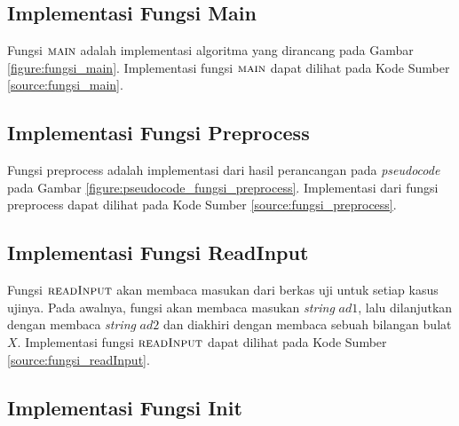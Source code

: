 \begin{minipage}{\linewidth}

\end{minipage}
	
\subsection{Implementasi Fungsi Main}
Fungsi $ \textnormal{\scshape main} $ adalah implementasi algoritma yang dirancang pada Gambar \ref{figure:fungsi_main}. Implementasi fungsi $ \textnormal{\scshape main} $ dapat dilihat pada Kode Sumber \ref{source:fungsi_main}.



\subsection{Implementasi Fungsi Preprocess}
Fungsi preprocess adalah implementasi dari hasil perancangan pada \textit{pseudocode} pada Gambar \ref{figure:pseudocode_fungsi_preprocess}. Implementasi dari fungsi preprocess dapat dilihat pada Kode Sumber \ref{source:fungsi_preprocess}.



\subsection{Implementasi Fungsi ReadInput}

Fungsi $ \textnormal{\scshape readInput} $ akan membaca masukan dari berkas uji untuk setiap kasus ujinya. Pada awalnya, fungsi akan membaca masukan \textit{string} $ad1$, lalu dilanjutkan dengan membaca \textit{string} $ad2$ dan diakhiri dengan membaca sebuah bilangan bulat $X$. Implementasi fungsi $ \textnormal{\scshape readInput} $ dapat dilihat pada Kode Sumber \ref{source:fungsi_readInput}. 



\subsection{Implementasi Fungsi Init}

